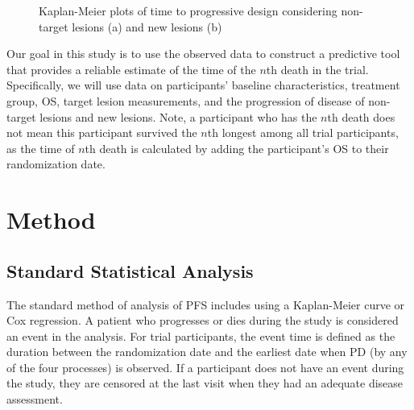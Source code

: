 \begin{figure}[ht]
    \centering
    \hfill
    \caption{Kaplan-Meier plots of time to progressive design considering non-target lesions (a) and new lesions (b)}
\end{figure}

Our goal in this study is to use the observed data to construct a predictive tool that provides a reliable estimate of the time of the $n$th death in the trial. Specifically, we will use data on participants' baseline characteristics, treatment group, \ac{OS}, target lesion measurements, and the progression of disease of non-target lesions and new lesions. Note, a participant who has the $n$th death does not mean this participant survived the $n$th longest among all trial participants, as the time of $n$th death is calculated by adding the participant's \ac{OS} to their randomization date.

\section{Method}
\label{sec:method}

\subsection{Standard Statistical Analysis}
The standard method of analysis of \ac{PFS} includes using a Kaplan-Meier curve or Cox regression. A patient who progresses or dies during the study is considered an event in the analysis. For trial participants, the event time is defined as the duration between the randomization date and the earliest date when \ac{PD} (by any of the four processes) is observed. If a participant does not have an event during the study, they are censored at the last visit when they had an adequate disease assessment.

